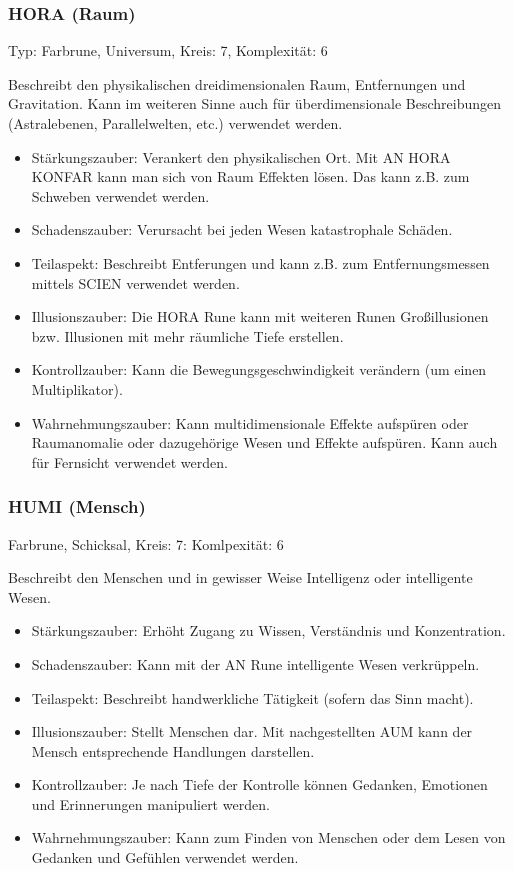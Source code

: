 \documentclass{article}
\begin{document}
\subsubsection{HORA (Raum)}

Typ: Farbrune, Universum, Kreis: 7, Komplexität: 6

Beschreibt den physikalischen dreidimensionalen Raum, Entfernungen und Gravitation. Kann im weiteren Sinne auch für
überdimensionale Beschreibungen (Astralebenen, Parallelwelten, etc.) verwendet werden.

\begin{itemize}
\item Stärkungszauber: Verankert den physikalischen Ort. Mit AN HORA KONFAR kann man sich von Raum Effekten lösen. Das kann z.B. zum Schweben verwendet werden.
\item Schadenszauber: Verursacht bei jeden Wesen katastrophale Schäden.
\item Teilaspekt: Beschreibt Entferungen und kann z.B. zum Entfernungsmessen mittels SCIEN verwendet werden.
\item Illusionszauber: Die HORA Rune kann mit weiteren Runen Großillusionen bzw. Illusionen mit mehr räumliche Tiefe erstellen.
\item Kontrollzauber: Kann die Bewegungsgeschwindigkeit verändern (um einen Multiplikator).
\item Wahrnehmungszauber: Kann multidimensionale Effekte aufspüren oder Raumanomalie oder dazugehörige Wesen und Effekte aufspüren. Kann auch für Fernsicht verwendet werden.
\end{itemize}

\subsubsection{HUMI (Mensch)}

Farbrune, Schicksal, Kreis: 7: Komlpexität: 6

Beschreibt den Menschen und in gewisser Weise Intelligenz oder intelligente Wesen.

\begin{itemize}
\item Stärkungszauber: Erhöht Zugang zu Wissen, Verständnis und Konzentration.
\item Schadenszauber: Kann mit der AN Rune intelligente Wesen verkrüppeln.
\item Teilaspekt: Beschreibt handwerkliche Tätigkeit (sofern das Sinn macht).
\item Illusionszauber: Stellt Menschen dar. Mit nachgestellten AUM kann der Mensch entsprechende Handlungen darstellen.
\item Kontrollzauber: Je nach Tiefe der Kontrolle können Gedanken, Emotionen und Erinnerungen manipuliert werden.
\item Wahrnehmungszauber: Kann zum Finden von Menschen oder dem Lesen von Gedanken und Gefühlen verwendet werden.
\end{itemize}
\end{document}
